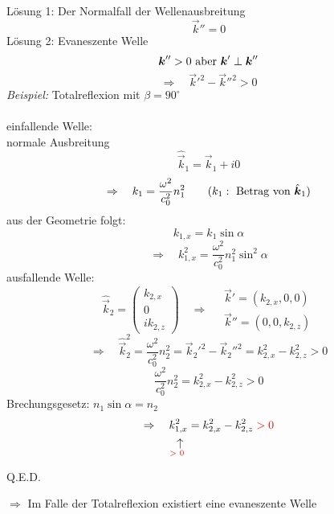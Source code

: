Lösung 1: Der Normalfall der Wellenausbreitung
\begin{equation*}
\vec{k}'' = 0
\end{equation*}
Lösung 2: Evaneszente Welle
\begin{equation*}
\boldsymbol{k}'' > 0 \ \textrm{aber} \ \boldsymbol{k}' \perp \boldsymbol{k}''
\end{equation*}
\begin{equation*}
\Rightarrow \quad \vec{k}'^2 - \vec{k}''^2 > 0
\end{equation*}
\emph{Beispiel:} Totalreflexion mit $ \beta = 90 ^\circ $\\
\\[5pt]
einfallende Welle:\\
normale Ausbreitung
\begin{equation*}
\hat{\vec{k}}_1 = \vec{k}_1 + i 0
\end{equation*}
\begin{equation*}
\Rightarrow \quad k_1 = \frac{\omega^2}{c_0^2} n_1^2 \qquad (k_1: \textrm{ Betrag von } \hat{\boldsymbol{k}}_1)
\end{equation*}
aus der Geometrie folgt:
\begin{equation*}
k_{1,x} = k_1 \sin\alpha
\end{equation*}
\begin{equation*}
\Rightarrow \quad k_{1,x}^2 = \frac{\omega^2}{c_0^2} n_1^2 \sin^2 \alpha
\end{equation*}
ausfallende Welle:
\begin{equation*}
\hat{\vec{k}}_2 = \begin{pmatrix}
k_{2,x} \\ 0 \\ i k_{2,z}
\end{pmatrix} \quad \Rightarrow \quad \begin{array}{c}
\vec{k}' = (k_{2,x} , 0 , 0) \\ \vec{k}'' = (0 , 0 , k_{2,z})
\end{array}
\end{equation*}
\begin{equation*}
\Rightarrow \quad \hat{\vec{k}}_2^2 = \frac{\omega^2}{c_0^2} n_2^2 = \vec{k}_2'^2 - \vec{k}_2''^2 = k_{2,x}^2 - k_{2,z}^2 > 0
\end{equation*}
\begin{equation*}
\frac{\omega^2}{c_0^2} n_2^2 = k_{2,x}^2 - k_{2,z}^2 > 0
\end{equation*}
Brechungsgesetz: $ n_1 \sin\alpha = n_2 $
\begin{equation*}
\Rightarrow \quad \custo{\leftarrow}{k_{1,x}^2}{\tx{\color{red} > 0 \color{black}}} = k_{2,x}^2 - k_{2,z}^2 \color{red} >0 \color{black}
\end{equation*}
\begin{flushright}
	\vspace{-20pt}
	\color{red} Q.E.D. \color{black}
\end{flushright}
$ \Rightarrow $ Im Falle der Totalreflexion existiert eine evaneszente Welle \mau

